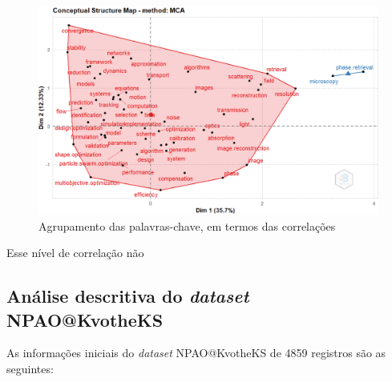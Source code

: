     \begin{figure}[H]
        \centering
        \includegraphics[width=1\textwidth]{experiments/KvotheKS/PesqBibliogr/AlgoritmosSimulacaoOptica-Dinamica/WoS-20220202/Clustering/Conceptual_structure_map.PNG}
        \caption{Agrupamento das palavras-chave, em termos das correlações}
        \label{fig:KvotheKS:Conceptual_structure_map}
    \end{figure}
    
    Esse nível de correlação não 
\subsection{Análise descritiva do \emph{dataset} NPAO@KvotheKS}
    As informações iniciais do \emph{dataset} NPAO@KvotheKS de 4859 registros são as seguintes:
    
